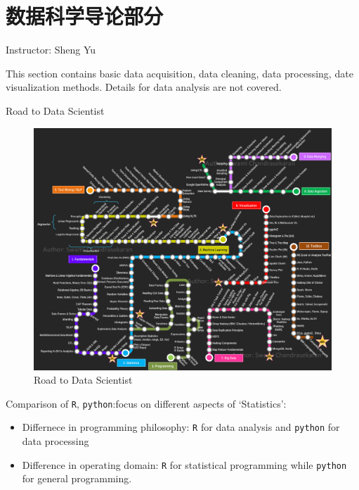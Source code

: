 \section{数据科学导论部分}\label{SecDataScience}
\begin{center}
    Instructor: Sheng Yu
\end{center}

    This section contains basic data acquisition, data cleaning, data processing, date visualization methods. Details for data analysis are not covered.

\begin{point}
    Road to Data Scientist
\end{point}

\begin{figure}[H]
    \centering
    \includegraphics[width=\linewidth]{sections/images/RoadToDataScientist1.png}
    \caption{Road to Data Scientist}
    \label{RoadToDataScience}
\end{figure}


Comparison of \lstinline|R|, \lstinline|python|:focus on different aspects of `Statistics':
\begin{itemize}[topsep=2pt,itemsep=0pt]
    \item Differnece in programming philosophy: \lstinline|R| for data analysis and \lstinline|python| for data processing
    \item Difference in operating domain: \lstinline|R| for statistical programming while \lstinline|python| for general programming.
\end{itemize}



